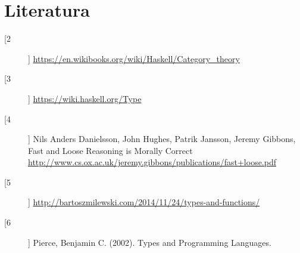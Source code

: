 \documentclass[11pt]{article}
\theoremstyle{definition}
\begin{document}
  \newpage
  \section*{Literatura}
  \begin{description}
    \item[[2]]
      \url {https://en.wikibooks.org/wiki/Haskell/Category\_theory}
    \item[[3]]
      \url {https://wiki.haskell.org/Type}

    \item[[4]] \label{bib:fast-loose}
      Nils Anders Danielsson, John Hughes, Patrik Jansson, Jeremy Gibbons,
Fast and Loose Reasoning is Morally Correct
\url{http://www.cs.ox.ac.uk/jeremy.gibbons/publications/fast+loose.pdf}
  \item[[5]]
    \url{http://bartoszmilewski.com/2014/11/24/types-and-functions/}
  \item[[6]]
    Pierce, Benjamin C. (2002). Types and Programming Languages.
  \end{description}
\end{document}
